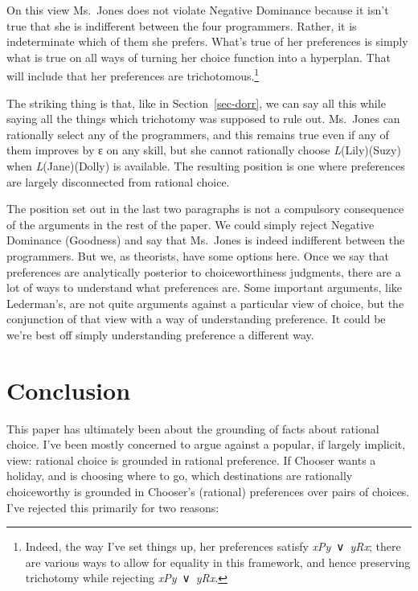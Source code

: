 \documentclass[
  11pt,
  letterpaper,
  DIV=11,
  numbers=noendperiod,
  twoside]{scrartcl}
\begin{document}
On this view Ms.~Jones does not violate Negative Dominance because it
isn't true that she is indifferent between the four programmers. Rather,
it is indeterminate which of them she prefers. What's true of her
preferences is simply what is true on all ways of turning her choice
function into a hyperplan. That will include that her preferences are
trichotomous.\footnote{Indeed, the way I've set things up, her
  preferences satisfy \emph{xPy}~∨~\emph{yRx}; there are various ways to
  allow for equality in this framework, and hence preserving trichotomy
  while rejecting \emph{xPy}~∨~\emph{yRx}.}

The striking thing is that, like in Section~\ref{sec-dorr}, we can say
all this while saying all the things which trichotomy was supposed to
rule out. Ms.~Jones can rationally select any of the programmers, and
this remains true even if any of them improves by ε on any skill, but
she cannot rationally choose \emph{L}(Lily)(Suzy) when
\emph{L}(Jane)(Dolly) is available. The resulting position is one where
preferences are largely disconnected from rational choice.

The position set out in the last two paragraphs is not a compulsory
consequence of the arguments in the rest of the paper. We could simply
reject Negative Dominance (Goodness) and say that Ms.~Jones is indeed
indifferent between the programmers. But we, as theorists, have some
options here. Once we say that preferences are analytically posterior to
choiceworthiness judgments, there are a lot of ways to understand what
preferences are. Some important arguments, like Lederman's, are not
quite arguments against a particular view of choice, but the conjunction
of that view with a way of understanding preference. It could be we're
best off simply understanding preference a different way.

\section{Conclusion}\label{sec-conclusion}

This paper has ultimately been about the grounding of facts about
rational choice. I've been mostly concerned to argue against a popular,
if largely implicit, view: rational choice is grounded in rational
preference. If Chooser wants a holiday, and is choosing where to go,
which destinations are rationally choiceworthy is grounded in Chooser's
(rational) preferences over pairs of choices. I've rejected this
primarily for two reasons:
\end{document}
